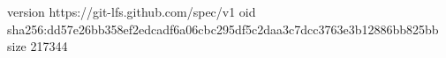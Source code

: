 version https://git-lfs.github.com/spec/v1
oid sha256:dd57e26bb358ef2edcadf6a06cbc295df5c2daa3c7dcc3763e3b12886bb825bb
size 217344
